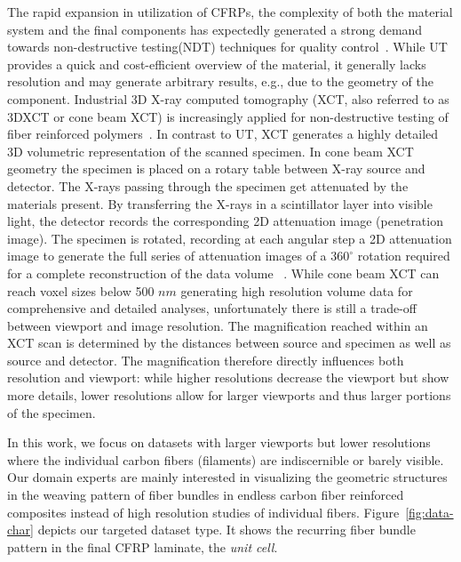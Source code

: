 {The rapid expansion in utilization of CFRPs, the complexity of both the material system and the final components has expectedly generated a strong demand towards non-destructive testing(NDT) techniques for quality control~\cite{Red2012}.}  While UT provides a quick and cost-efficient overview of the material, it generally lacks resolution and may generate arbitrary results, e.g., due to the geometry of the component. Industrial 3D X-ray computed tomography (XCT, also referred to as 3DXCT or cone beam XCT) is increasingly applied for non-destructive testing of fiber reinforced polymers~\cite{Kastner2012}. In contrast to UT, XCT generates a highly detailed 3D volumetric representation of the scanned specimen. In cone beam XCT geometry the specimen is placed on a rotary table between X-ray source and detector. The X-rays passing through the specimen get attenuated by the materials present. By transferring the X-rays in a scintillator layer into visible light, the detector records the corresponding 2D attenuation image (penetration image). The specimen is rotated, recording at each angular step a 2D attenuation image to generate the full series of attenuation images of a $360^\circ$ rotation required for a complete reconstruction of the data volume ~\cite{heinzl-2008-thesis}. 
While cone beam XCT can reach voxel sizes below 500 $nm$ generating high resolution volume data for comprehensive and detailed analyses, unfortunately there is still a trade-off between viewport and image resolution. The magnification reached within an XCT scan is determined by the distances between source and specimen as well as source and detector. The magnification therefore directly influences both resolution and viewport: while higher resolutions decrease the viewport but show more details, lower resolutions allow for larger viewports and thus larger portions of the specimen.

In this work, we focus on datasets with larger viewports but
lower resolutions where the individual carbon fibers (filaments) are indiscernible or barely visible. Our domain experts are mainly interested in visualizing the geometric structures in the weaving pattern of fiber bundles in endless carbon fiber reinforced composites instead of high resolution studies of individual fibers.
Figure~\ref{fig:data-char} depicts our targeted dataset type. It shows the recurring fiber bundle pattern in the final CFRP laminate, the \textit{unit cell}.


